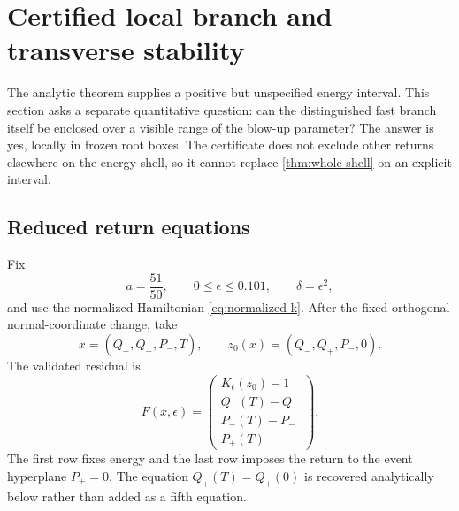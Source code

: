 \section{Certified local branch and transverse stability}
\label{sec:certified-branch}

The analytic theorem supplies a positive but unspecified energy interval.
This section asks a separate quantitative question: can the distinguished
fast branch itself be enclosed over a visible range of the blow-up parameter?
The answer is yes, locally in frozen root boxes.  The certificate does not
exclude other returns elsewhere on the energy shell, so it cannot replace
\cref{thm:whole-shell} on an explicit interval.

\subsection{Reduced return equations}

Fix
\begin{equation}
 a=\frac{51}{50},
 \qquad 0\le\epsilon\le0.101,
 \qquad \delta=\epsilon^2,
 \label{eq:validated-domain}
\end{equation}
and use the normalized Hamiltonian \cref{eq:normalized-k}.  After the fixed
orthogonal normal-coordinate change, take
\begin{equation}
 x=(Q_-,Q_+,P_-,T),
 \qquad
 z_0(x)=(Q_-,Q_+,P_-,0).
 \label{eq:shooting-unknowns}
\end{equation}
The validated residual is
\begin{equation}
 F(x,\epsilon)=
 \begin{pmatrix}
 K_\epsilon(z_0)-1\\
 Q_-(T)-Q_-\\
 P_-(T)-P_-\\
 P_+(T)
 \end{pmatrix}.
 \label{eq:validated-residual}
\end{equation}
The first row fixes energy and the last row imposes the return to the event
hyperplane \(P_+=0\).  The equation \(Q_+(T)=Q_+(0)\) is recovered
analytically below rather than added as a fifth equation.

